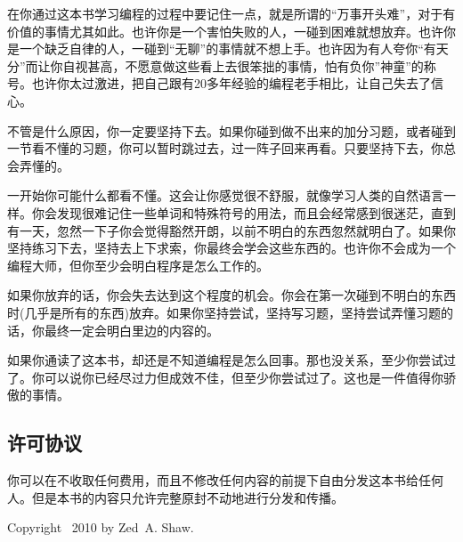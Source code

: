 在你通过这本书学习编程的过程中要记住一点，就是所谓的“万事开头难”，对于有价值的事情尤其如此。也许你是一个害怕失败的人，一碰到困难就想放弃。也许你是一个缺乏自律的人，一碰到“无聊”的事情就不想上手。也许因为有人夸你“有天分”而让你自视甚高，不愿意做这些看上去很笨拙的事情，怕有负你”神童”的称号。也许你太过激进，把自己跟有20多年经验的编程老手相比，让自己失去了信心。

不管是什么原因，你一定要坚持下去。如果你碰到做不出来的加分习题，或者碰到一节看不懂的习题，你可以暂时跳过去，过一阵子回来再看。只要坚持下去，你总会弄懂的。

一开始你可能什么都看不懂。这会让你感觉很不舒服，就像学习人类的自然语言一样。你会发现很难记住一些单词和特殊符号的用法，而且会经常感到很迷茫，直到有一天，忽然一下子你会觉得豁然开朗，以前不明白的东西忽然就明白了。如果你坚持练习下去，坚持去上下求索，你最终会学会这些东西的。也许你不会成为一个编程大师，但你至少会明白程序是怎么工作的。

如果你放弃的话，你会失去达到这个程度的机会。你会在第一次碰到不明白的东西时(几乎是所有的东西)放弃。如果你坚持尝试，坚持写习题，坚持尝试弄懂习题的话，你最终一定会明白里边的内容的。

如果你通读了这本书，却还是不知道编程是怎么回事。那也没关系，至少你尝试过了。你可以说你已经尽过力但成效不佳，但至少你尝试过了。这也是一件值得你骄傲的事情。
\subsection*{许可协议} %
\label{sub:许可协议}
你可以在不收取任何费用，而且不修改任何内容的前提下自由分发这本书给任何人。但是本书的内容只允许完整原封不动地进行分发和传播。

Copyright \textcopyright~2010 by Zed~A. Shaw.
